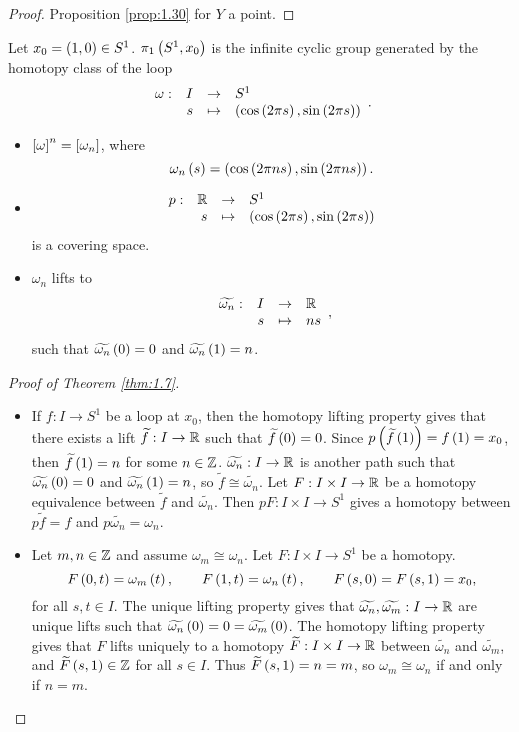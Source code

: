 \begin{proof}
Proposition \ref{prop:1.30} for $ Y $ a point.
\end{proof}

\begin{theorem}
\label{thm:1.7}
Let $ x_0 = \rb{1, 0} \in S^1 $. $ \pi_1\rb{S^1, x_0} $ is the infinite cyclic group generated by the homotopy class of the loop
$$ \function[\omega]{I}{S^1}{s}{\rb{\cos\rb{2\pi s}, \sin\rb{2\pi s}}}. $$
\end{theorem}

\begin{remark*}
\hfill
\begin{itemize}
\item $ \sb{\omega}^n = \sb{\omega_n} $, where
$$ \omega_n\rb{s} = \rb{\cos\rb{2\pi ns}, \sin\rb{2\pi ns}}. $$
\item
$$ \function[p]{\R}{S^1}{s}{\rb{\cos\rb{2\pi s}, \sin\rb{2\pi s}}} $$
is a covering space.
\item $ \omega_n $ lifts to
$$ \function[\widetilde{\omega_n}]{I}{\R}{s}{ns}, $$
such that $ \widetilde{\omega_n}\rb{0} = 0 $ and $ \widetilde{\omega_n}\rb{1} = n $.
\end{itemize}
\end{remark*}

\begin{proof}[Proof of Theorem \ref{thm:1.7}]
\hfill
\begin{itemize}
\item If $ f : I \to S^1 $ be a loop at $ x_0 $, then the homotopy lifting property gives that there exists a lift $ \widetilde{f} : I \to \R $ such that $ \widetilde{f}\rb{0} = 0 $. Since $ p\rb{\widetilde{f}\rb{1}} = f\rb{1} = x_0 $, then $ \widetilde{f}\rb{1} = n $ for some $ n \in \Z $. $ \widetilde{\omega_n} : I \to \R $ is another path such that $ \widetilde{\omega_n}\rb{0} = 0 $ and $ \widetilde{\omega_n}\rb{1} = n $, so $ \widetilde{f} \cong \widetilde{\omega_n} $. Let $ F : I \times I \to \R $ be a homotopy equivalence between $ \widetilde{f} $ and $ \widetilde{\omega_n} $. Then $ pF : I \times I \to S^1 $ gives a homotopy between $ p\widetilde{f} = f $ and $ p\widetilde{\omega_n} = \omega_n $.
\item Let $ m, n \in \Z $ and assume $ \omega_m \cong \omega_n $. Let $ F : I \times I \to S^1 $ be a homotopy.
$$ F\rb{0, t} = \omega_m\rb{t}, \qquad F\rb{1, t} = \omega_n\rb{t}, \qquad F\rb{s, 0} = F\rb{s, 1} = x_0, $$
for all $ s, t \in I $. The unique lifting property gives that $ \widetilde{\omega_n}, \widetilde{\omega_m} : I \to \R $ are unique lifts such that $ \widetilde{\omega_n}\rb{0} = 0 = \widetilde{\omega_m}\rb{0} $. The homotopy lifting property gives that $ F $ lifts uniquely to a homotopy $ \widetilde{F} : I \times I \to \R $ between $ \widetilde{\omega_n} $ and $ \widetilde{\omega_m} $, and $ \widetilde{F}\rb{s, 1} \in \Z $ for all $ s \in I $. Thus $ \widetilde{F}\rb{s, 1} = n = m $, so $ \omega_m \cong \omega_n $ if and only if $ n = m $.
\end{itemize}
\end{proof}


